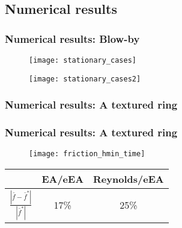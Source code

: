 \documentclass[10pt,aspectratio=169]{beamer}
\begin{document}
\subsection{Numerical results}
\setcounter{showSlideNumbers}{0}
\begin{frame}[noframenumbering]
\tableofcontents[
currentsection,
currentsubsection,
subsectionstyle=show/shaded/hide
]
\end{frame}
\setcounter{showSlideNumbers}{1}

\begin{frame}
\frametitle{Numerical results: Blow-by}
\vspace*{1.0cm}
\begin{minipage}{0.5\textwidth}
	\begin{figure}
		\texttt{[image: stationary\_cases]}
	\end{figure}
\end{minipage}%
\begin{minipage}{0.5\textwidth}
	\begin{figure}
		\texttt{[image: stationary\_cases2]}
	\end{figure}
\end{minipage}
\end{frame}

\begin{frame}
\frametitle{Numerical results: A textured ring}\vspace*{0.5cm}
\begin{center}
\begin{minipage}{0.9\textwidth}
	\centering 
\end{minipage}
\end{center}

\end{frame}

\begin{frame}
\frametitle{Numerical results: A textured ring}\vspace*{0.5cm}
\begin{minipage}{0.45\linewidth}
\begin{figure}
	\centering
	\texttt{[image: friction\_hmin\_time]}
\end{figure}
\end{minipage}
%
\begin{minipage}{0.45\linewidth}
\begin{table}\hspace*{2cm}
		\begin{tabular}{ccc}
			\toprule
			& EA/eEA & Reynolds/eEA\\
			\midrule
			$\frac{|\bar{f}-\bar{f}^*|}{|\bar{f}^*|}$ & 17\% & 25\% \\
			\bottomrule
	\end{tabular}
\end{table}
\end{minipage}
\end{frame}
\end{document}
